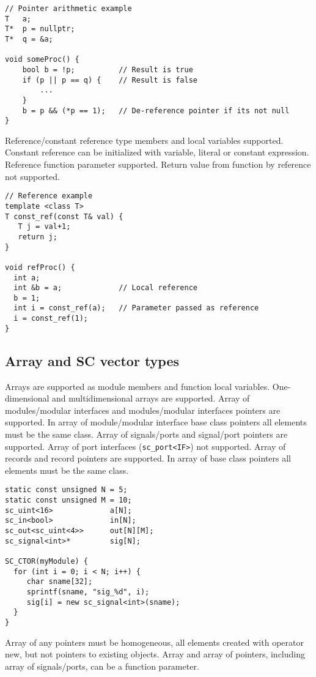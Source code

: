 \begin{lstlisting}[style=mycpp]
// Pointer arithmetic example
T   a;
T*  p = nullptr;
T*  q = &a;

void someProc() {
    bool b = !p;          // Result is true
    if (p || p == q) {    // Result is false
        ...
    }
    b = p && (*p == 1);   // De-reference pointer if its not null
}
\end{lstlisting}

Reference/constant reference type members and local variables supported. Constant reference can be initialized with variable, literal or constant expression. Reference function parameter supported. Return value from function by reference not supported. 
%
\begin{lstlisting}[style=mycpp]
// Reference example
template <class T>
T const_ref(const T& val) {
   T j = val+1;
   return j;
}

void refProc() {
  int a;
  int &b = a;             // Local reference
  b = 1;
  int i = const_ref(a);   // Parameter passed as reference
  i = const_ref(1);
}
\end{lstlisting}


\subsection{Array and SC vector types}

Arrays are supported as module members and function local variables. One-dimensional and multidimensional arrays are supported. Array of modules/modular interfaces and modules/modular interfaces pointers are supported.  In array of module/modular interface base class pointers all elements must be the same class. Array of signals/ports and signal/port pointers are supported. Array of port interfaces ({\tt sc\_port<IF>}) not supported. Array of records and record pointers are supported. In array of base class pointers all elements must be the same class.
%
\begin{lstlisting}[style=mycpp]
static const unsigned N = 5;   
static const unsigned M = 10;   
sc_uint<16>  		    a[N];
sc_in<bool>             in[N];
sc_out<sc_uint<4>>      out[N][M];
sc_signal<int>*     	sig[N];

SC_CTOR(myModule) {
  for (int i = 0; i < N; i++) {
     char sname[32];
     sprintf(sname, "sig_%d", i); 
     sig[i] = new sc_signal<int>(sname);
  }   
}
\end{lstlisting}

Array of any pointers must be homogeneous, all elements created with operator new, but not pointers to existing objects. 
Array and array of pointers, including array of signals/ports, can be a function parameter. 
 
